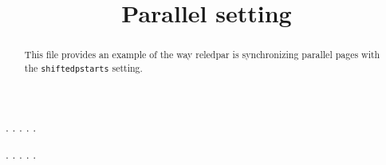 \documentclass[a5paper,12pt]{article}
\begin{document}
\large

\date{}
\title{Parallel setting}
\maketitle

\begin{abstract}
This file provides an example of the way reledpar is synchronizing parallel pages with the \verb+shiftedpstarts+ setting.
\end{abstract}


\begin{pages}
    \begin{Leftside}
        \beginnumbering
            . \blindtext[21]
            \pend{}. \blindtext[10]
            \pend{}. \blindtext[6]
            \pend{}. \blindtext[6]
            \pend
            . \blindtext[6]
            \pend
        \endnumbering
    \end{Leftside}
    \begin{Rightside}
        \beginnumbering
            . \blindtext[22]\footnoteAmk
            \pend{}. \blindtext[12]
            \pend{}. \blindtext[12]
            \pend
            . \blindtext[12]
            \pend
            . \blindtext[12]
            \pend
        \endnumbering
    \end{Rightside}
\end{pages}
\Pages
\end{document}
